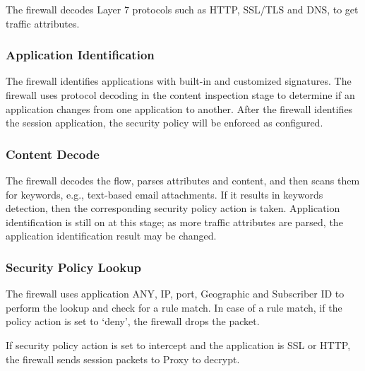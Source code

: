 The firewall decodes Layer 7 protocols such as HTTP, SSL/TLS and DNS, to get traffic attributes.

\subsubsection*{\hypertarget{link:Application Identification}{Application Identification}}
\label{sec:appendix_e:sequence:firewall:identification}

The firewall identifies applications with built-in and customized signatures. The firewall uses protocol decoding in the content inspection stage to determine 
if an application changes from one application to another. After the firewall identifies the session application, the security policy will be enforced as configured. 

\subsubsection*{\hypertarget{link:Content Decode}{Content Decode}}
\label{sec:appendix_e:sequence:firewall:contentdecode}

The firewall decodes the flow, parses attributes and content, and then scans them for keywords, e.g., text-based email attachments. 
If it results in keywords detection, then the corresponding security policy action is taken. 
Application identification is still on at this stage; as more traffic attributes are parsed, the application identification result may be changed.

\subsubsection*{\hypertarget{link:Security Policy Lookup}{Security Policy Lookup}}
\label{sec:appendix_e:sequence:firewall:lookup}

The firewall uses application ANY, IP, port, Geographic and Subscriber ID to perform the lookup and check for a rule match. 
In case of a rule match, if the policy action is set to ‘deny’, the firewall drops the packet. 


If security policy action is set to intercept and the application is SSL or HTTP, the firewall sends session packets to Proxy to decrypt.


